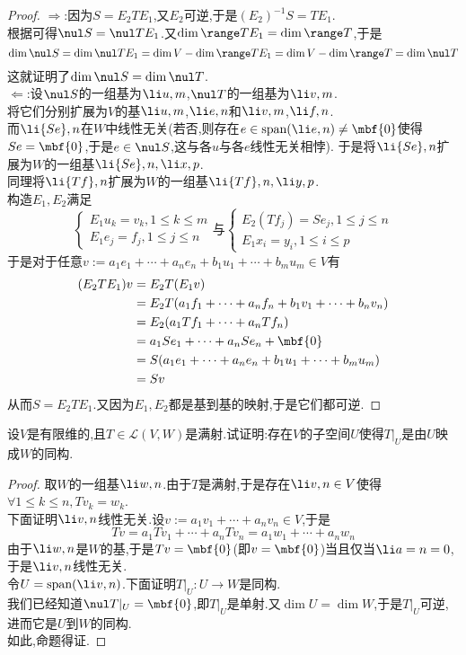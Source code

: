 \documentclass{ctexart}
\begin{document}
\begin{proof}
    $\Rightarrow$:因为$S=E_2TE_1$,又$E_2$可逆,于是$(E_2)^{-1}S=TE_1$.\\
    根据可得$\nul S=\nul TE_1$.又$\dim\range TE_1=\dim\range T$,于是
    $$\dim\nul S=\dim\nul TE_1=\dim V-\dim\range TE_1=\dim V-\dim\range T=\dim\nul T$$
    这就证明了$\dim\nul S=\dim\nul T$.\\
    $\Leftarrow$:设$\nul S$的一组基为$\li u,m$,$\nul T$的一组基为$\li v,m$.\\
    将它们分别扩展为$V$的基$\li u,m$,$\li e,n$和$\li v,m$,$\li f,n$.\\
    而$\li {Se},n$在$W$中线性无关(若否,则存在$e\in\text{span}(\li e,n)\neq\mbf{0}$使得$Se=\mbf{0}$,于是$e\in\nul S$,这与各$u$与各$e$线性无关相悖).%
    于是将$\li {Se},n$扩展为$W$的一组基$\li{Se},n,\li x,p$.\\
    同理将$\li {Tf},n$扩展为$W$的一组基$\li{Tf},n,\li y,p$.\\
    构造$E_1,E_2$满足
    $$\left\{\begin{array}{l}
        E_1u_k=v_k,1\leqslant k\leqslant m\\
        E_1e_j=f_j,1\leqslant j\leqslant n
    \end{array}\right.\text{与}
    \left\{\begin{array}{l}
        E_2(Tf_j)=Se_j,1\leqslant j\leqslant n\\
        E_1x_i=y_i,1\leqslant i\leqslant p
    \end{array}\right.$$
    于是对于任意$v:=a_1e_1+\cdots+a_ne_n+b_1u_1+\cdots+b_mu_m\in V$有
    $$\begin{aligned}
        (E_2TE_1)v
        &= E_2T(E_1v) \\
        &= E_2T(a_1f_1+\cdots+a_nf_n+b_1v_1+\cdots+b_nv_n) \\
        &= E_2(a_1Tf_1+\cdots+a_nTf_n) \\
        &= a_1Se_1+\cdots+a_nSe_n+\mbf{0} \\
        &= S(a_1e_1+\cdots+a_ne_n+b_1u_1+\cdots+b_mu_m) \\
        &= Sv
    \end{aligned}$$
    从而$S=E_2TE_1$.又因为$E_1,E_2$都是基到基的映射,于是它们都可逆.
\end{proof}
\begin{problem}[9.]
    设$V$是有限维的,且$T\in\mathcal{L}(V,W)$是满射.试证明:存在$V$的子空间$U$使得$T\vert_{U}$是由$U$映成$W$的同构.
\end{problem}
\begin{proof}
    取$W$的一组基$\li w,n$.由于$T$是满射,于是存在$\li v,n\in V$使得$\forall 1\leqslant k\leqslant n,Tv_k=w_k$.\\
    下面证明$\li v,n$线性无关.设$v:=a_1v_1+\cdots+a_nv_n\in V$,于是
    $$Tv=a_1Tv_1+\cdots+a_nTv_n=a_1w_1+\cdots+a_nw_n$$
    由于$\li w,n$是$W$的基,于是$Tv=\mbf{0}$(即$v=\mbf{0}$)当且仅当$\li a=n=0$,于是$\li v,n$线性无关.\\
    令$U=\text{span}(\li v,n)$.下面证明$T\vert_{U}:U\to W$是同构.\\
    我们已经知道$\nul T\vert_U=\mbf{0}$,即$T\vert_U$是单射.又$\dim U=\dim W$,于是$T\vert_U$可逆,进而它是$U$到$W$的同构.\\
    如此,命题得证.
\end{proof}
\end{document}
